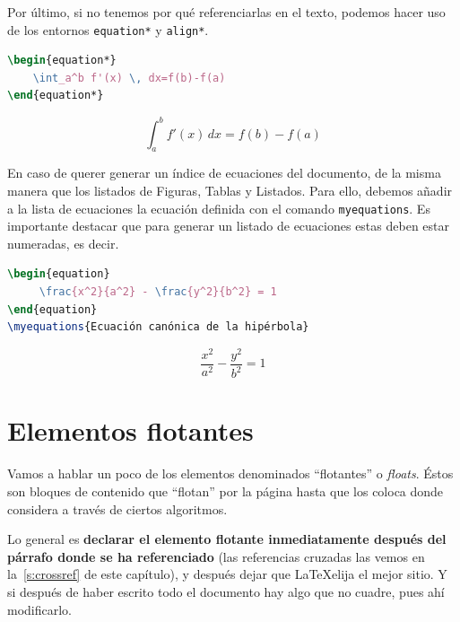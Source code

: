 \documentclass[%
    school=etsisi,%
    type=pfg,%
    degree=61CD,%
]{upm-report}
\begin{document}
Por último, si no tenemos por qué referenciarlas en el texto, podemos hacer uso de los entornos \texttt{equation*} y \texttt{align*}.

\begin{minipage}[c]{.5\textwidth}
\begin{lstlisting}[language=tex]
\begin{equation*}
    \int_a^b f'(x) \, dx=f(b)-f(a)
\end{equation*}
\end{lstlisting}
\end{minipage}%
\begin{minipage}[c]{.5\textwidth}
\begin{equation*}
    \int_a^b f'(x) \, dx=f(b)-f(a)
\end{equation*}
\end{minipage}

En caso de querer generar un índice de ecuaciones del documento, de la misma manera que los listados de Figuras, Tablas y Listados. Para ello, debemos añadir a la lista de ecuaciones la ecuación definida con el comando \texttt{myequations}. Es importante destacar que para generar un listado de ecuaciones estas deben estar numeradas, es decir.

\begin{minipage}[c]{.5\textwidth}
\begin{lstlisting}[language=tex]
\begin{equation}
     \frac{x^2}{a^2} - \frac{y^2}{b^2} = 1
\end{equation}
\myequations{Ecuación canónica de la hipérbola}
\end{lstlisting}
\end{minipage}%
\begin{minipage}[c]{.5\textwidth}
\begin{equation}
     \frac{x^2}{a^2} - \frac{y^2}{b^2} = 1
\end{equation}
\end{minipage} 

\section{Elementos flotantes}

Vamos a hablar un poco de los elementos denominados \enquote{flotantes} o \textit{floats}. Éstos son bloques de contenido que \enquote{flotan} por la página hasta que  los coloca donde considera a través de ciertos algoritmos.

Lo general es \textbf{declarar el elemento flotante inmediatamente después del párrafo donde se ha referenciado} (las referencias cruzadas las vemos en la~\autoref{s:crossref} de este capítulo), y después dejar que \LaTeX\space elija el mejor sitio. Y si después de haber escrito todo el documento hay algo que no cuadre, pues ahí modificarlo.
\end{document}
